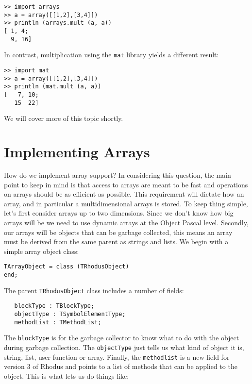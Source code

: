 \begin{lstlisting}
>> import arrays
>> a = array([[1,2],[3,4]])
>> println (arrays.mult (a, a))
[ 1, 4;
  9, 16]
\end{lstlisting}

In contrast, multiplication using the {\tt mat} library yields a different result:

\begin{lstlisting}
>> import mat
>> a = array([[1,2],[3,4]])
>> println (mat.mult (a, a))
[   7, 10;
   15  22]
\end{lstlisting}

We will cover more of this topic shortly.

\section{Implementing Arrays}

How do we implement array support? In considering this question, the main point to keep in mind is that access to arrays are meant to be fast and operations on arrays should be as efficient as possible. This requirement will dictate how an array, and in particular a multidimensional arrays is stored. To keep thing simple, let's first consider arrays up to two dimensions. Since we don't know how big arrays will be we need to use dynamic arrays at the Object Pascal level. Secondly, our arrays will be objects that can be garbage collected, this means an array must be derived from the same parent as strings and lists. We begin with a simple array object class:

\begin{lstlisting}
TArrayObject = class (TRhodusObject)
end;
\end{lstlisting}

The parent {\tt TRhodusObject} class includes a number of fields:

\begin{lstlisting}
   blockType : TBlockType;
   objectType : TSymbolElementType;
   methodList : TMethodList;
\end{lstlisting}

The {\tt blockType} is for the garbage collector to know what to do with the object during garbage collection. The {\tt objectType} just tells us what kind of object it is, string, list, user function or array. Finally, the {\tt methodlist} is a new field for version 3 of Rhodus and points to a list of methods that can be applied to the object. This is what lets us do things like:

